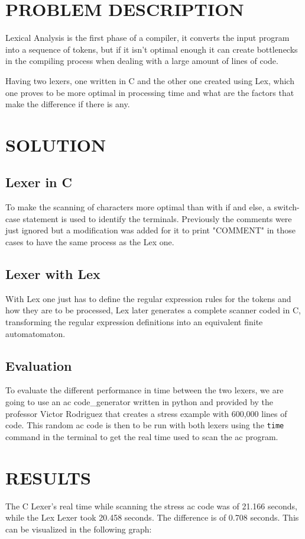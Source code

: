 \documentclass[letterpaper, 10 pt, conference]{ieeeconf}  %
\begin{document}
\section{PROBLEM DESCRIPTION}

Lexical Analysis is the first phase of a compiler, it converts the input program into a sequence of tokens, but if it isn't optimal enough it can create bottlenecks in the compiling process when dealing with a large amount of lines of code.

Having two lexers, one written in C and the other one created using Lex, which one proves to be more optimal in processing time and what are the factors that make the difference if there is any.

\section{SOLUTION}

\subsection{Lexer in C}
To make the scanning of characters more optimal than with if and else, a switch-case statement is used to identify the terminals. Previously the comments were just ignored but a modification was added for it to print "COMMENT" in those cases to have the same process as the Lex one.

\subsection{Lexer with Lex}
With Lex one just has to define the regular expression rules for the tokens and how they are to be processed, Lex later generates a complete scanner coded in C, transforming the regular expression definitions into an equivalent finite automatomaton.

\subsection{Evaluation}
To evaluate the different performance in time between the two lexers, we are going to use an ac code\_generator written in python and provided by the professor Victor Rodriguez that creates a stress example with 600,000 lines of code. This random ac code is then to be run with both lexers using the \texttt{time} command in the terminal to get the real time used to scan the ac program.


\section{RESULTS}
The C Lexer's real time while scanning the stress ac code was of 21.166 seconds, while the Lex Lexer took 20.458 seconds. The difference is of 0.708 seconds. \newline
This can be visualized in the following graph:\newline
\end{document}
